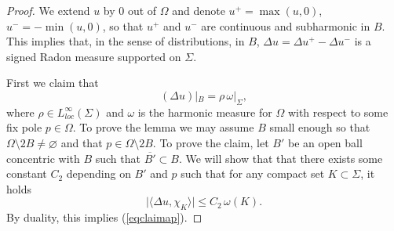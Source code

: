 \documentclass[11pt]{amsart}
\newcommand{\rf}[1]{{(\ref{#1})}}
\theoremstyle{definition}
\theoremstyle{remark}
\numberwithin{equation}{section}
\begin{document}
\begin{proof}
We extend $u$ by $0$ out of $\Omega$ and denote $u^+=\max(u,0)$, $u^-=-\min(u,0)$, so that $u^+$ and $u^-$ are continuous and subharmonic in $B$. This implies that, in the sense of distributions, in $B$, $\Delta u = \Delta u^+ - \Delta u^-$ is a signed Radon measure
supported on $\Sigma$.

First we claim that
\begin{equation}\label{eqclaimap}
(\Delta u)|_B = \rho\,\omega|_\Sigma,
\end{equation}
where $\rho\in L^\infty_{loc}(\Sigma)$ and $\omega$ is the harmonic measure for $\Omega$ with respect to some fix pole $p\in\Omega$. To prove the lemma we may assume $B$ small enough 
so that $\Omega\setminus 2B\neq\varnothing$ and that $p\in\Omega\setminus 2B$.
To prove the claim, let $B'$ be an open ball concentric with $B$ such that 
$\overline {B'}\subset B$. We will show that that there exists some constant $C_2$ depending on $B'$ and $p$ such that for any compact set $K\subset \Sigma$, it holds
\begin{equation}\label{eqclaimap2}
\big|\langle \Delta u,\chi_K\rangle \big|\leq C_2\,\omega(K).
\end{equation}
By duality, this implies \rf{eqclaimap}.



\end{proof}
\end{document}
